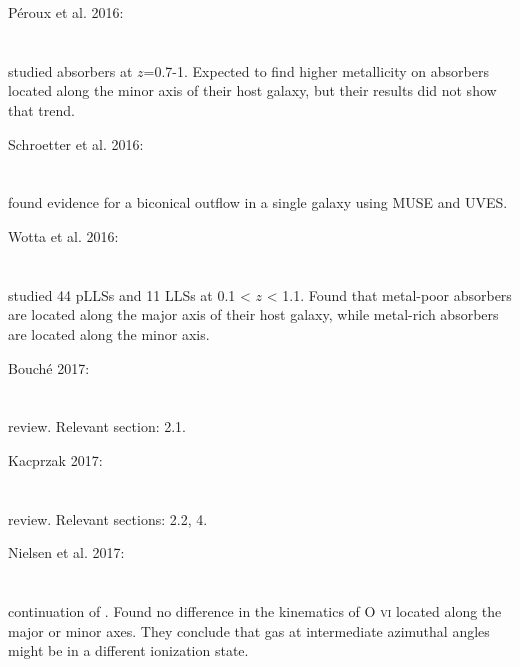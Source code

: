 \hline

Péroux et al. 2016: \\
\citet{2016MNRAS.457..903P} \\
\citep{2016MNRAS.457..903P} \\
studied absorbers at $z$=0.7-1. Expected to find higher metallicity on absorbers
located along the minor axis of their host galaxy, but their results did not
show that trend. \\

\hline

Schroetter et al. 2016: \\
\citet{2016ApJ...833...39S} \\
\citep{2016ApJ...833...39S} \\
found evidence for a biconical outflow in a single galaxy using MUSE and
UVES. \\

\hline

Wotta et al. 2016: \\
\citet{2016ApJ...831...95W} \\
\citep{2016ApJ...831...95W} \\
studied 44 pLLSs and 11 LLSs at 0.1 < $z$ < 1.1. Found that metal-poor absorbers
are located along the major axis of their host galaxy, while metal-rich
absorbers are located along the minor axis. \\

\hline

Bouché 2017: \\
\citet{2017ASSL..430..355B} \\
\citep{2017ASSL..430..355B} \\
review. Relevant section: 2.1. \\

\hline

Kacprzak 2017: \\
\citet{2017ASSL..430..145K} \\
\citep{2017ASSL..430..145K} \\
review. Relevant sections: 2.2, 4. \\

\hline

Nielsen et al. 2017: \\
\citet{2017ApJ...834..148N} \\
\citep{2017ApJ...834..148N} \\
continuation of \citet{2015ApJ...815...22K}. Found no difference in the
kinematics of O \textsc{vi} located along the major or minor axes. They conclude
that gas at intermediate azimuthal angles might be in a different ionization
state. \\

